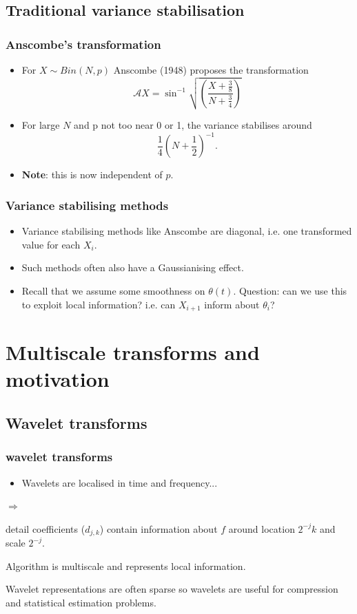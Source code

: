 \documentclass{beamer}
\def\im{{\Rightarrow}}
\def\th{\theta}
\def\beq{\begin{equation}}
\def\eeq{\end{equation}}
\begin{document}
\subsection{Traditional variance stabilisation}
\begin{frame}
\frametitle{Anscombe's transformation}
\begin{itemize}
\item For $X \sim Bin(N,p)$ Anscombe (1948) proposes the transformation
\beq \label{anscbin} \mathcal{A}X=\sin^{-1}\sqrt{\left(
\frac{X+\frac{3}{8}}{N+\frac{3}{4}}\right)} \eeq   \pause
\item For large $N$ and p not too near 0 or 1, the variance stabilises around
$$\frac{1}{4}\left(N+\frac{1}{2}\right)^{-1}.$$\pause
\item {\bf{Note}}: this is now independent of $p$.
\end{itemize}
\end{frame}

\begin{frame}
\frametitle{Variance stabilising methods}
\begin{itemize}
\item  Variance stabilising methods like Anscombe are
 diagonal, i.e. one transformed value for each $X_i$.\pause
\item Such methods often also have a Gaussianising effect.\pause
\item Recall that we assume some smoothness on $\th(t)$.\pause
\vspace{.5cm}
Question: can we use this to exploit local
information? i.e. can $X_{i+1}$ inform about $\th_{i}$?
\end{itemize}
\end{frame}

\section{Multiscale transforms and motivation}
\subsection{Wavelet transforms}
\begin{frame}
\frametitle{wavelet transforms}

\begin{itemize}
\item Wavelets are localised in time and frequency... \pause
\end{itemize}
\vspace{.3cm}
\begin{list}{$\im$}{\setlength{\itemsep}{.25cm}}
\item detail coefficients ($d_{j,k}$) contain information about $f$ around location
$2^{-j}k$ and scale $2^{-j}$.\pause
\item Algorithm is multiscale and represents local information.\pause
\item Wavelet representations are often sparse so wavelets are useful for compression and statistical
estimation problems.
\end{list}
\end{frame}
\end{document}
